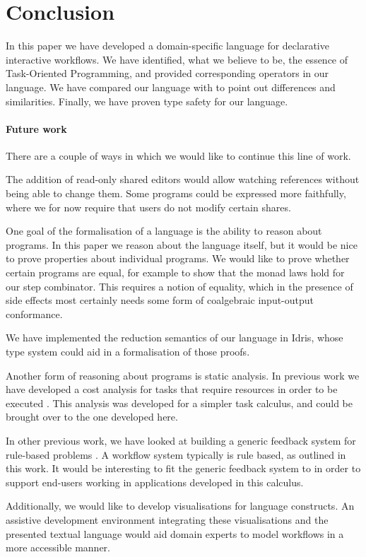 
\section{Conclusion}

\label{sec:conclusions}

In this paper we have developed a domain-specific language for declarative interactive workflows.
We have identified, what we believe to be, the essence of Task-Oriented Programming, and provided corresponding operators in our language.
We have compared our language with \CSP to point out differences and similarities.
Finally, we have proven type safety for our language.

\paragraph{Future work}

There are a couple of ways in which we would like to continue this line of work.

The addition of read-only shared editors would allow watching references without being able to change them.
Some programs could be expressed more faithfully, where we for now require that users do not modify certain shares.

One goal of the formalisation of a language is the ability to reason about programs.
In this paper we reason about the language itself, but it would be nice to prove properties about individual programs.
We would like to prove whether certain programs are equal, for example to show that the monad laws hold for our step combinator.
This requires a notion of equality, which in the presence of side effects most certainly needs some form of coalgebraic input-output conformance.

We have implemented the reduction semantics of our language in Idris, whose type system could aid in a formalisation of those proofs.

Another form of reasoning about programs is static analysis.
In previous work we have developed a cost analysis for tasks that require resources in order to be executed \cite{conf/ifl/KlinikJP17}.
This analysis was developed for a simpler task calculus, and could be brought over to the one developed here.

In other previous work, we have looked at building a generic feedback system for rule-based problems \cite{UUCS2017013}.
A workflow system typically is rule based, as outlined in this work.
It would be interesting to fit the generic feedback system to \TOPHAT in order to support end-users working in applications developed in this calculus.

Additionally, we would like to develop visualisations for \TOPHAT language constructs.
An assistive development environment integrating these visualisations and the presented textual language
would aid domain experts to model workflows in a more accessible manner.
